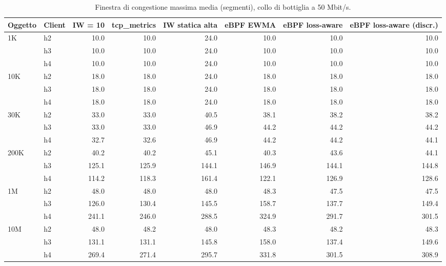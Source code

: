 \begin{table}[htbp]
  \centering
  \caption{Finestra di congestione massima media (segmenti), collo di bottiglia a 50 Mbit/s.}
  \label{tab:cwnd-50}
  \begin{tabular}{llrrrrrr}
    \toprule
    Oggetto & Client & IW = 10 & tcp\_metrics & IW statica alta & eBPF EWMA & eBPF loss-aware & eBPF loss-aware (discr.) \\
    \midrule
    1K & h2 & 10.0 & 10.0 & 24.0 & 10.0 & 10.0 & 10.0 \\
     & h3 & 10.0 & 10.0 & 24.0 & 10.0 & 10.0 & 10.0 \\
     & h4 & 10.0 & 10.0 & 24.0 & 10.0 & 10.0 & 10.0 \\
    \addlinespace
    10K & h2 & 18.0 & 18.0 & 24.0 & 18.0 & 18.0 & 18.0 \\
     & h3 & 18.0 & 18.0 & 24.0 & 18.0 & 18.0 & 18.0 \\
     & h4 & 18.0 & 18.0 & 24.0 & 18.0 & 18.0 & 18.0 \\
    \addlinespace
    30K & h2 & 33.0 & 33.0 & 40.5 & 38.1 & 38.2 & 38.2 \\
     & h3 & 33.0 & 33.0 & 46.9 & 44.2 & 44.2 & 44.2 \\
     & h4 & 32.7 & 32.6 & 46.9 & 44.2 & 44.2 & 44.1 \\
    \addlinespace
    200K & h2 & 40.2 & 40.2 & 45.1 & 40.3 & 43.6 & 44.1 \\
     & h3 & 125.1 & 125.9 & 144.1 & 146.9 & 144.1 & 144.8 \\
     & h4 & 114.2 & 118.3 & 161.4 & 122.1 & 126.9 & 128.6 \\
    \addlinespace
    1M & h2 & 48.0 & 48.0 & 48.0 & 48.3 & 47.5 & 47.5 \\
     & h3 & 126.0 & 130.4 & 145.5 & 158.7 & 137.7 & 149.4 \\
     & h4 & 241.1 & 246.0 & 288.5 & 324.9 & 291.7 & 301.5 \\
    \addlinespace
    10M & h2 & 48.0 & 48.2 & 48.0 & 48.3 & 48.2 & 48.3 \\
     & h3 & 131.1 & 131.1 & 145.8 & 158.0 & 137.4 & 149.6 \\
     & h4 & 269.4 & 271.4 & 295.7 & 331.8 & 301.5 & 308.9 \\
    \bottomrule
  \end{tabular}
\end{table}
